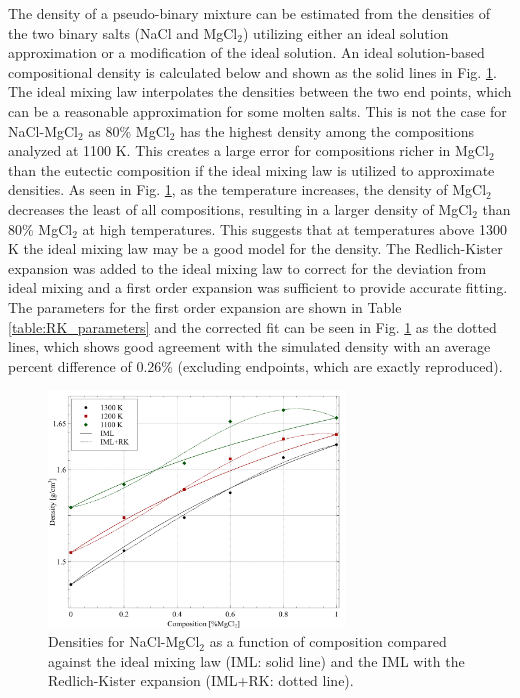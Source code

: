 \documentclass[review]{elsarticle}
\begin{document}
The density of a pseudo-binary mixture can be estimated from the densities of the two binary salts (NaCl and MgCl$_2$) utilizing either an ideal solution approximation or a modification of the ideal solution. An ideal solution-based compositional density is calculated below and shown as the solid lines in Fig. \ref{fig:density_mixing}. The ideal mixing law interpolates the densities between the two end points, which can be a reasonable approximation for some molten salts. This is not the case for NaCl-MgCl$_2$ as 80\% MgCl$_2$ has the highest density among the compositions analyzed at 1100 K. This creates a large error for compositions richer in MgCl$_2$ than the eutectic composition if the ideal mixing law is utilized to approximate densities. As seen in Fig. \ref{fig:density_mixing}, as the temperature increases, the density of MgCl$_2$ decreases the least of all compositions, resulting in a larger density of MgCl$_2$ than 80\% MgCl$_2$ at high temperatures. This suggests that at temperatures above 1300 K the ideal mixing law may be a good model for the density. The Redlich-Kister expansion was added to the ideal mixing law to correct for the deviation from ideal mixing and a first order expansion was sufficient to provide accurate fitting. The parameters for the first order expansion are shown in Table \ref{table:RK_parameters} and the corrected fit can be seen in Fig. \ref{fig:density_mixing} as the dotted lines, which shows good agreement with the simulated density with an average percent difference of 0.26\% (excluding endpoints, which are exactly reproduced). 

\begin{figure}[h]
 \centering
 \includegraphics[width=0.7\textwidth]{images/density_mixing.jpg} 
 \caption{Densities for NaCl-MgCl$_2$ as a function of composition compared against the ideal mixing law (IML: solid line) and the IML with the Redlich-Kister expansion (IML+RK: dotted line).}
 \label{fig:density_mixing}
\end{figure} 
\end{document}
